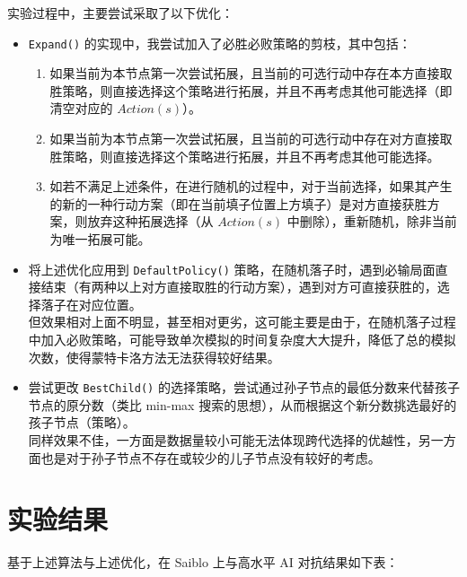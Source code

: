 \documentclass[a4paper]{article}
\begin{document}
    实验过程中，主要尝试采取了以下优化：
    \begin{itemize}
        \item \texttt{Expand()} 的实现中，我尝试加入了必胜必败策略的剪枝，其中包括：
        \begin{enumerate}
            \item 如果当前为本节点第一次尝试拓展，且当前的可选行动中存在本方直接取胜策略，则直接选择这个策略进行拓展，并且不再考虑其他可能选择（即清空对应的 $Action(s)$）。
            \item 如果当前为本节点第一次尝试拓展，且当前的可选行动中存在对方直接取胜策略，则直接选择这个策略进行拓展，并且不再考虑其他可能选择。
            \item 如若不满足上述条件，在进行随机的过程中，对于当前选择，如果其产生的新的一种行动方案（即在当前填子位置上方填子）是对方直接获胜方案，则放弃这种拓展选择（从 $Action(s)$ 中删除），重新随机，除非当前为唯一拓展可能。
        \end{enumerate}
        \item 将上述优化应用到 \texttt{DefaultPolicy()} 策略，在随机落子时，遇到必输局面直接结束（有两种以上对方直接取胜的行动方案），遇到对方可直接获胜的，选择落子在对应位置。\\
        但效果相对上面不明显，甚至相对更劣，这可能主要是由于，在随机落子过程中加入必败策略，可能导致单次模拟的时间复杂度大大提升，降低了总的模拟次数，使得蒙特卡洛方法无法获得较好结果。
        \item 尝试更改 \texttt{BestChild()} 的选择策略，尝试通过孙子节点的最低分数来代替孩子节点的原分数（类比 min-max 搜索的思想），从而根据这个新分数挑选最好的孩子节点（策略）。 \\
        同样效果不佳，一方面是数据量较小可能无法体现跨代选择的优越性，另一方面也是对于孙子节点不存在或较少的儿子节点没有较好的考虑。
    \end{itemize}

    \section{实验结果}

    基于上述算法与上述优化，在 Saiblo 上与高水平 AI 对抗结果如下表：
\end{document}
